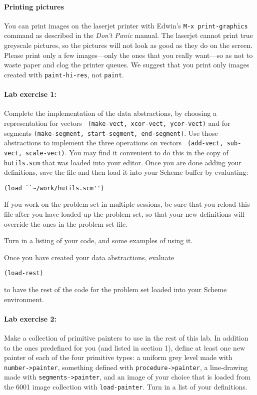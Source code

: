 \paragraph{Printing pictures} You can print images on the laserjet
printer with Edwin's {\tt M-x print-graphics} command as described
in the {\em Don't Panic} manual.  The laserjet cannot print true
greyscale pictures, so the pictures will not look as good as they do
on the screen. Please print only a few images---only the ones that you
really want---so as not to waste paper and clog the printer queues.
We suggest that you print only images created with {\tt paint-hi-res},
not {\tt paint}.

\paragraph{Lab exercise 1:}  Complete the implementation of the data
abstractions, by choosing a representation for vectors {\tt
(make-vect, xcor-vect, ycor-vect)} and for
segments {\tt (make-segment, start-segment, end-segment)}.  Use those
abstractions to implement the three operations on vectors {\tt
(add-vect, sub-vect, scale-vect)}.  You may find it convenient to do
this in the copy of {\tt hutils.scm} that was loaded into your editor.
Once you are done adding your definitions, save the file and then load
it into your Scheme buffer by evaluating:

\begin{verbatim}
(load ``~/work/hutils.scm'')
\end{verbatim}

If you work on the problem set in multiple sessions, be sure that you
reload this file after you have loaded up the problem set, so that
your new definitions will override the ones in the problem set file.

Turn in a listing of your
code, and some examples of using it.

\vskip 20pt

Once you have created your data abstractions,  evaluate

\begin{verbatim}
(load-rest)
\end{verbatim}
 
\noindent
to have the rest of the code for the problem set loaded into your
Scheme environment.

\paragraph{Lab exercise 2:}
Make a collection of primitive painters to use in the rest of this
lab.  In addition to the ones predefined for you (and listed in
section 1), define at least one new painter of each of the four
primitive types: a uniform grey level made with {\tt number->painter},
something defined with {\tt procedure->painter}, a line-drawing made
with {\tt segments->painter}, and an image of your choice that is
loaded from the 6001 image collection with {\tt load-painter}.  Turn
in a list of your definitions.

